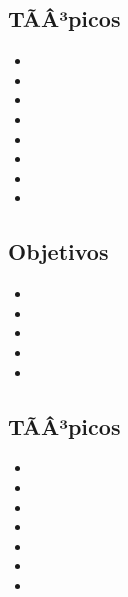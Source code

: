 \subsection{\OSSIETEDef}\label{sec:BOK-OS7}

\subsection*{TÃÂ³picos}
\begin{itemize}
	\item \OSSIETETopicVision
	\item \OSSIETETopicPolitica
	\item \OSSIETETopicMetodos
	\item \OSSIETETopicProteccion
	\item \OSSIETETopicModelos
	\item \OSSIETETopicProteccionde
	\item \OSSIETETopicEncriptacion
	\item \OSSIETETopicAdministracion
\end{itemize}

\subsection*{Objetivos}
\begin{itemize}
	\item \OSSIETEObjUNO
	\item \OSSIETEObjDOS
	\item \OSSIETEObjTRES
	\item \OSSIETEObjCUATRO
	\item \OSSIETEObjCINCO
\end{itemize}

\subsection{\OSOCHODef}\label{sec:BOK-OS8}

\subsection*{TÃÂ³picos}
\begin{itemize}
	\item \OSOCHOTopicArchivos
	\item \OSOCHOTopicDirectorios
	\item \OSOCHOTopicSistemas
	\item \OSOCHOTopicTecnicas
	\item \OSOCHOTopicArchivosmapeados
	\item \OSOCHOTopicSistemasde
	\item \OSOCHOTopicNombrado
\end{itemize}

